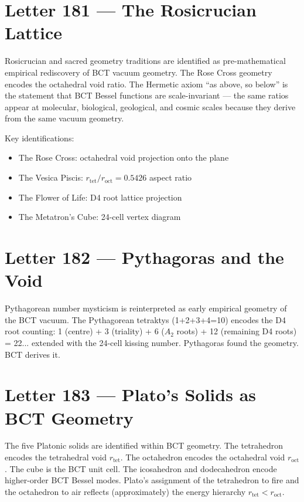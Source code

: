 \documentclass[aps,prl,twocolumn,showpacs,preprintnumbers]{revtex4-2}
\newcommand{\roct}{r_{\mathrm{oct}}}
\newcommand{\rtet}{r_{\mathrm{tet}}}
\begin{document}
\section{Letter 181 --- The Rosicrucian Lattice}

Rosicrucian and sacred geometry traditions are identified as
pre-mathematical empirical rediscovery of BCT vacuum geometry.
The Rose Cross geometry encodes the octahedral void ratio. The
Hermetic axiom ``as above, so below'' is the statement that BCT
Bessel functions are scale-invariant --- the same ratios appear at
molecular, biological, geological, and cosmic scales because they
derive from the same vacuum geometry.

Key identifications:
\begin{itemize}
  \item The Rose Cross: octahedral void projection onto the plane
  \item The Vesica Piscis: $\rtet/\roct = 0.5426$ aspect ratio
  \item The Flower of Life: D4 root lattice projection
  \item The Metatron's Cube: 24-cell vertex diagram
\end{itemize}

\section{Letter 182 --- Pythagoras and the Void}

Pythagorean number mysticism is reinterpreted as early empirical
geometry of the BCT vacuum. The Pythagorean tetraktys (1+2+3+4=10)
encodes the D4 root counting: 1 (centre) + 3 (triality) + 6
($A_2$ roots) + 12 (remaining D4 roots) = 22... extended with the
24-cell kissing number. Pythagoras found the geometry. BCT derives it.

\section{Letter 183 --- Plato's Solids as BCT Geometry}

The five Platonic solids are identified within BCT geometry. The
tetrahedron encodes the tetrahedral void $\rtet$. The octahedron
encodes the octahedral void $\roct$. The cube is the BCT unit cell.
The icosahedron and dodecahedron encode higher-order BCT Bessel
modes. Plato's assignment of the tetrahedron to fire and the
octahedron to air reflects (approximately) the energy hierarchy
$\rtet < \roct$.
\end{document}
